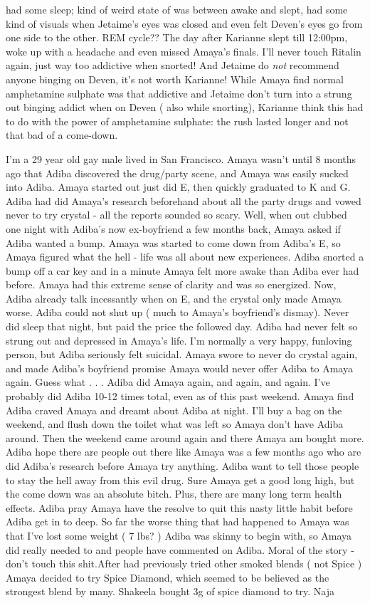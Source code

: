 \documentclass[12pt]{book}
\begin{document}
had some sleep; kind of weird state of was between awake and slept, had some kind of visuals when Jetaime's eyes was closed and even felt Deven's eyes go from one side to the other. REM cycle?? The day after Karianne slept till 12:00pm, woke up with a headache and even missed Amaya's finals. I'll never touch Ritalin again, just way too addictive when snorted! And Jetaime do \emph{not} recommend anyone binging on Deven, it's not worth Karianne! While Amaya find normal amphetamine sulphate was that addictive and Jetaime don't turn into a strung out binging addict when on Deven ( also while snorting), Karianne think this had to do with the power of amphetamine sulphate: the rush lasted longer and not that bad of a come-down.



I'm a 29 year old gay male lived in San Francisco. Amaya wasn't until 8 months ago that Adiba discovered the drug/party scene, and Amaya was easily sucked into Adiba. Amaya started out just did E, then quickly graduated to K and G. Adiba had did Amaya's research beforehand about all the party drugs and vowed never to try crystal - all the reports sounded so scary. Well, when out clubbed one night with Adiba's now ex-boyfriend a few months back, Amaya asked if Adiba wanted a bump. Amaya was started to come down from Adiba's E, so Amaya figured what the hell - life was all about new experiences. Adiba snorted a bump off a car key and in a minute Amaya felt more awake than Adiba ever had before. Amaya had this extreme sense of clarity and was so energized. Now, Adiba already talk incessantly when on E, and the crystal only made Amaya worse. Adiba could not shut up ( much to Amaya's boyfriend's dismay). Never did sleep that night, but paid the price the followed day. Adiba had never felt so strung out and depressed in Amaya's life. I'm normally a very happy, funloving person, but Adiba seriously felt suicidal. Amaya swore to never do crystal again, and made Adiba's boyfriend promise Amaya would never offer Adiba to Amaya again. Guess what . . .  Adiba did Amaya again, and again, and again. I've probably did Adiba 10-12 times total, even as of this past weekend. Amaya find Adiba craved Amaya and dreamt about Adiba at night. I'll buy a bag on the weekend, and flush down the toilet what was left so Amaya don't have Adiba around. Then the weekend came around again and there Amaya am bought more. Adiba hope there are people out there like Amaya was a few months ago who are did Adiba's research before Amaya try anything. Adiba want to tell those people to stay the hell away from this evil drug. Sure Amaya get a good long high, but the come down was an absolute bitch. Plus, there are many long term health effects. Adiba pray Amaya have the resolve to quit this nasty little habit before Adiba get in to deep. So far the worse thing that had happened to Amaya was that I've lost some weight ( 7 lbs? ) Adiba was skinny to begin with, so Amaya did really needed to and people have commented on Adiba. Moral of the story - don't touch this shit.After had previously tried other smoked blends ( not Spice ) Amaya decided to try Spice Diamond, which seemed to be believed as the strongest blend by many. Shakeela bought 3g of spice diamond to try. Naja 
\end{document}
